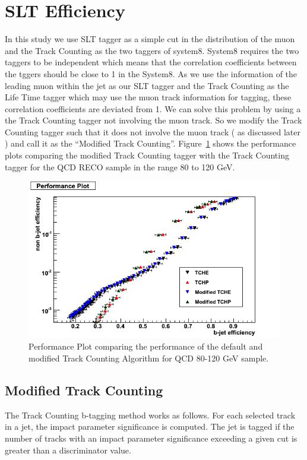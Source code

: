 \section{SLT Efficiency}

In this study we use SLT tagger as a simple cut in the \ptrel distribution of
the muon and the Track Counting  as the two taggers of system8. System8 
requires the two taggers to be independent which means that the correlation 
coefficients between the tggers should be close to 1 in the System8. As we use 
the \ptrel information of the leading muon within the jet as our SLT tagger 
and the Track Counting as the Life Time tagger  which may use the muon track 
information for tagging, these correlation coefficients are deviated from 1.
We can solve this problem by using a the Track Counting tagger not involving 
the muon track. So we modify the Track Counting tagger such that it does not 
involve the muon track ( as discussed later ) and call it as the ``Modified 
Track Counting''. Figure~\ref{fig:Performanceplot} shows the performance plots
 comparing the modified Track Counting tagger with the Track Counting tagger
for the QCD RECO sample in the \pt range 80 to 120 GeV.

\begin{figure}[htbp]
  \begin{center}
    \includegraphics[width=120mm]{Figures/QCD_80_120.png}
  \end{center}
  \caption{Performance Plot comparing the performance of the default and 
modified Track Counting Algorithm for QCD 80-120 GeV sample.}
  \label{fig:Performanceplot}
\end{figure}


\subsection{Modified Track Counting}
\label{sec:MTC}
The Track Counting b-tagging method works as follows. For each selected track
in a jet, the impact parameter significance is computed. The jet is tagged if 
the number of tracks with an impact parameter significance exceeding a given 
cut is greater than a discriminator value.

